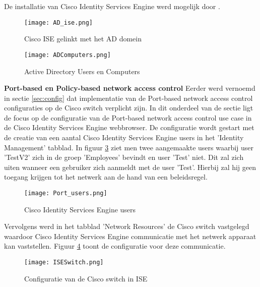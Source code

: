 De installatie van Cisco Identity Services Engine werd mogelijk door \cite{CiscoISE_InstallationGuide}.

\begin{figure}[H]
	\centering
	\texttt{[image: AD\_ise.png]}
	\caption{Cisco ISE gelinkt met het AD domein}%
	\label{fig:AD_Cisco1}%
\end{figure}

\begin{figure}[H]
	\centering
	\texttt{[image: ADComputers.png]}
	\caption{Active Directory Users en Computers}
	\label{fig:AD_Cisco2}
\end{figure}

\fontsize{12}{20}\textbf{Port-based en Policy-based network access control }
 \newline
\newline
	Eerder werd vernoemd in sectie \ref{sec:config} dat implementatie van de Port-based network access control configuraties op de Cisco switch verplicht zijn. In dit onderdeel van de sectie ligt de focus op de configuratie van de Port-based network access control use case in de Cisco Identity Services Engine webbrowser. 
	\newline
	\newline
	De configuratie wordt gestart met de creatie van een aantal Cisco Identity Services Engine users in het 'Identity Management' tabblad. In figuur \ref{fig:users} ziet men twee aangemaakte users waarbij user 'TestV2' zich in de groep 'Employees' bevindt en user 'Test' niet. Dit zal zich uiten wanneer een gebruiker zich aanmeldt met de user 'Test'. Hierbij zal hij geen toegang krijgen tot het netwerk aan de hand van een beleidsregel.
 	\begin{figure}[H]
 		\centering
 		\texttt{[image: Port\_users.png]}
 		\caption{Cisco Identity Services Engine users}%
 		\label{fig:users}%
 	\end{figure}
 Vervolgens werd in het tabblad 'Network Resources' de Cisco switch vastgelegd waardoor Cisco Identity Services Engine communicatie met het netwerk apparaat kan vaststellen. Figuur \ref{fig:ISESwitch} toont de configuratie voor deze communicatie. 
 	
 	 	\begin{figure}[H]
 		\centering
 		\texttt{[image: ISESwitch.png]}
 		\caption{Configuratie van de Cisco switch in ISE}%
 		\label{fig:ISESwitch}%
 		\end{figure}
 	
